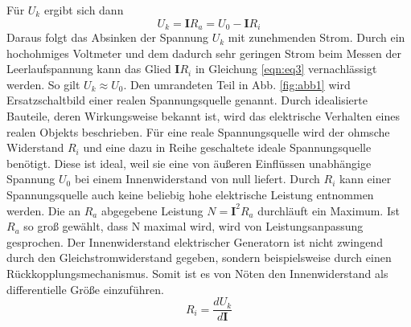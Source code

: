 Für $U_k$ ergibt sich dann
\begin{equation}
  U_k = \symbf{I} R_a = U_0 - \symbf{I} R_i
  \label{eqn:eq3}
\end{equation}
Daraus folgt das Absinken der Spannung $U_k$ mit zunehmenden Strom.
Durch ein hochohmiges Voltmeter und dem dadurch sehr geringen Strom beim Messen der Leerlaufspannung kann das Glied $\symbf{I} R_i$ in Gleichung \ref{eqn:eq3} vernachlässigt werden.
So gilt $U_k \approx U_0$.
Den umrandeten Teil in Abb. \ref{fig:abb1} wird Ersatzschaltbild einer realen Spannungsquelle genannt.
Durch idealisierte Bauteile, deren Wirkungsweise bekannt ist, wird das elektrische Verhalten eines realen Objekts beschrieben.
Für eine reale Spannungsquelle wird der ohmsche Widerstand $R_i$ und eine dazu in Reihe geschaltete ideale Spannungsquelle benötigt.
Diese ist ideal, weil sie eine von äußeren Einflüssen unabhängige Spannung $U_0$ bei einem Innenwiderstand von null liefert.
Durch $R_i$ kann einer Spannungsquelle auch keine beliebig hohe elektrische Leistung entnommen werden.
Die an $R_a$ abgegebene Leistung $N = \symbf{I}^2 R_a$ durchläuft ein Maximum.
Ist $R_a$ so groß gewählt, dass N maximal wird, wird von Leistungsanpassung gesprochen.
Der Innenwiderstand elektrischer Generatorn ist nicht zwingend durch den Gleichstromwiderstand gegeben, sondern beispielsweise durch einen Rückkopplungsmechanismus.
Somit ist es von Nöten den Innenwiderstand als differentielle Größe einzuführen.
\begin{equation}
  R_i = \frac{dU_k}{d\symbf{I}}
  \label{eqn:eq4}
\end{equation}
